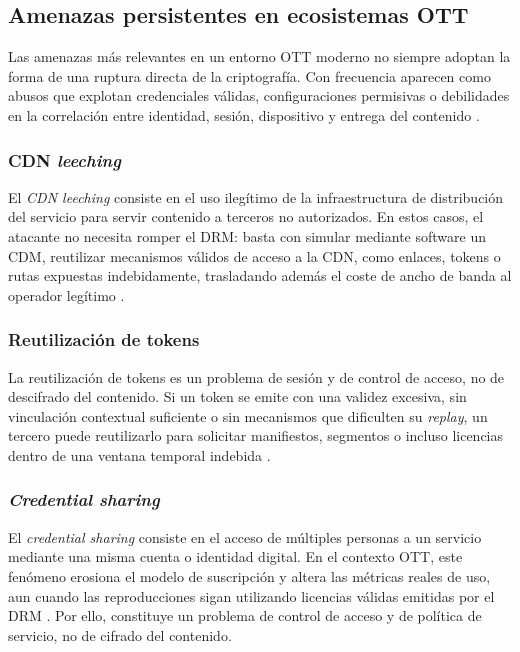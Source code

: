 \subsection{Amenazas persistentes en ecosistemas OTT}

Las amenazas más relevantes en un entorno OTT moderno no siempre adoptan la forma de una ruptura directa de la criptografía. Con frecuencia aparecen como abusos que explotan credenciales válidas, configuraciones permisivas o debilidades en la correlación entre identidad, sesión, dispositivo y entrega del contenido \cite{googlemediacdn2026,awscloudfront2026,akamai2026,adobe2026,deloitte2024}.

\subsubsection{CDN \textit{leeching}}

El \textit{CDN leeching} consiste en el uso ilegítimo de la infraestructura de distribución del servicio para servir contenido a terceros no autorizados. En estos casos, el atacante no necesita romper el DRM: basta con simular mediante software un CDM, reutilizar mecanismos válidos de acceso a la CDN, como enlaces, tokens o rutas expuestas indebidamente, trasladando además el coste de ancho de banda al operador legítimo \cite{simon2024cdn,googlemediacdn2026,awscloudfront2026}.

\subsubsection{Reutilización de tokens}

La reutilización de tokens es un problema de sesión y de control de acceso, no de descifrado del contenido. Si un token se emite con una validez excesiva, sin vinculación contextual suficiente o sin mecanismos que dificulten su \textit{replay}, un tercero puede reutilizarlo para solicitar manifiestos, segmentos o incluso licencias dentro de una ventana temporal indebida \cite{akamai2026}.

\subsubsection{\textit{Credential sharing}}

El \textit{credential sharing} consiste en el acceso de múltiples personas a un servicio mediante una misma cuenta o identidad digital. En el contexto OTT, este fenómeno erosiona el modelo de suscripción y altera las métricas reales de uso, aun cuando las reproducciones sigan utilizando licencias válidas emitidas por el DRM \cite{deloitte2024}. Por ello, constituye un problema de control de acceso y de política de servicio, no de cifrado del contenido.

